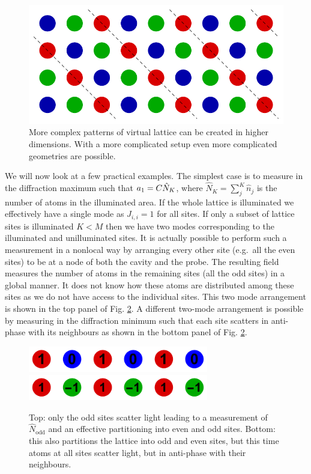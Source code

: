\begin{figure}[htbp!]
  \centering
  \includegraphics[width=1.0\textwidth]{2DModes}
  \caption[2D Modes due to Measurement Backaction]{ More complex
    patterns of virtual lattice can be created in higher
    dimensions. With a more complicated setup even more complicated
    geometries are possible.}
  \label{fig:2dmodes}
\end{figure}

We will now look at a few practical examples.  The simplest case is to
measure in the diffraction maximum such that $a_1 = C \hat{N}_K$,
where $\hat{N}_K = \sum_j^K \hat{n}_j$ is the number of atoms in the
illuminated area. If the whole lattice is illuminated we effectively
have a single mode as $J_{i,i} = 1$ for all sites. If only a subset of
lattice sites is illuminated $K < M$ then we have two modes
corresponding to the illuminated and unilluminated sites. It is
actually possible to perform such a measurement in a nonlocal way by
arranging every other site (e.g.~all the even sites) to be at a node
of both the cavity and the probe. The resulting field measures the
number of atoms in the remaining sites (all the odd sites) in a global
manner. It does not know how these atoms are distributed among these
sites as we do not have access to the individual sites. This two mode
arrangement is shown in the top panel of Fig. \ref{fig:twomodes}. A
different two-mode arrangement is possible by measuring in the
diffraction minimum such that each site scatters in anti-phase with
its neighbours as shown in the bottom panel of
Fig. \ref{fig:twomodes}. 

\begin{figure}[htbp!]
  \centering
  \includegraphics[width=0.7\textwidth]{TwoModes1}
  \includegraphics[width=0.7\textwidth]{TwoModes2}
  \caption[Two Mode Partitioning]{Top: only the odd sites scatter
    light leading to a measurement of $\hat{N}_\mathrm{odd}$ and an
    effective partitioning into even and odd sites. Bottom: this also
    partitions the lattice into odd and even sites, but this time
    atoms at all sites scatter light, but in anti-phase with their
    neighbours.}
  \label{fig:twomodes}
\end{figure}

